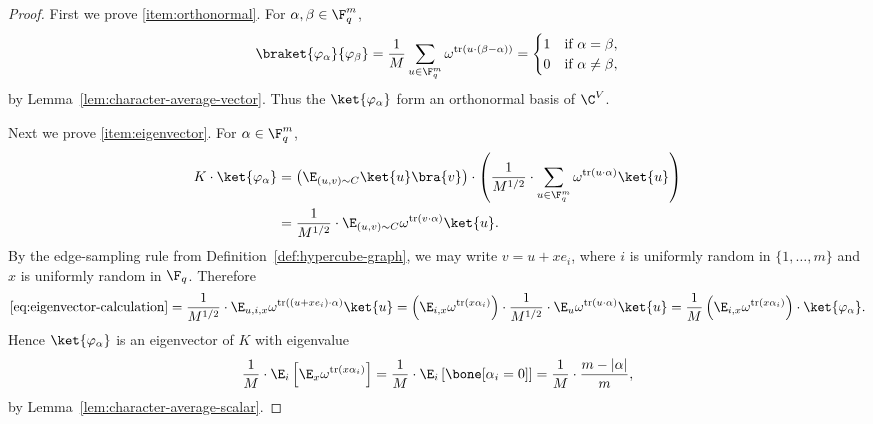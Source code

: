 \begin{proof}
	\leanok
	First we prove \ref{item:orthonormal}. For $\alpha,\beta \in \F_q^m$,
	\[
		\braket{\varphi_\alpha}{\varphi_\beta}
		=
		\frac{1}{M} \sum_{u \in \F_q^m} \omega^{\operatorname{tr}(u\cdot(\beta-\alpha))}
		=
		\begin{cases}
			1 & \text{if } \alpha=\beta,    \\
			0 & \text{if } \alpha\ne \beta,
		\end{cases}
	\]
	by Lemma~\ref{lem:character-average-vector}. Thus the $\ket{\varphi_\alpha}$ form an orthonormal basis of $\C^V$.

	Next we prove \ref{item:eigenvector}. For $\alpha \in \F_q^m$,
	\begin{equation}
		\begin{aligned}
			K \cdot \ket{\varphi_\alpha}
			 & =
			\left(\E_{(u,v)\sim C} \ket{u}\bra{v}\right) \cdot \left(\frac{1}{M^{1/2}} \cdot \sum_{u \in \F_q^m} \omega^{\operatorname{tr}(u\cdot \alpha)} \ket{u}\right) \\
			 & =
			\frac{1}{M^{1/2}} \cdot \E_{(u,v)\sim C} \omega^{\operatorname{tr}(v\cdot \alpha)} \ket{u}.
		\end{aligned}
		\label{eq:eigenvector-calculation}
	\end{equation}
	By the edge-sampling rule from Definition~\ref{def:hypercube-graph}, we may write $v=u+x e_i$, where $i$ is uniformly random in $\{1,\dots,m\}$ and $x$ is uniformly random in $\F_q$. Therefore
	\[
		\eqref{eq:eigenvector-calculation}
		=
		\frac{1}{M^{1/2}} \cdot \E_{u,i,x} \omega^{\operatorname{tr}((u+x e_i)\cdot \alpha)} \ket{u}
		=
		\left(\E_{i,x}\omega^{\operatorname{tr}(x\alpha_i)}\right) \cdot \frac{1}{M^{1/2}} \cdot \E_u \omega^{\operatorname{tr}(u\cdot \alpha)} \ket{u}
		=
		\frac{1}{M}\left(\E_{i,x}\omega^{\operatorname{tr}(x\alpha_i)}\right) \cdot \ket{\varphi_\alpha}.
	\]
	Hence $\ket{\varphi_\alpha}$ is an eigenvector of $K$ with eigenvalue
	\[
		\frac{1}{M} \cdot \E_i \left[\E_x \omega^{\operatorname{tr}(x\alpha_i)}\right]
		=
		\frac{1}{M} \cdot \E_i \left[\bone[\alpha_i=0]\right]
		=
		\frac{1}{M} \cdot \frac{m-|\alpha|}{m},
	\]
	by Lemma~\ref{lem:character-average-scalar}.
\end{proof}

